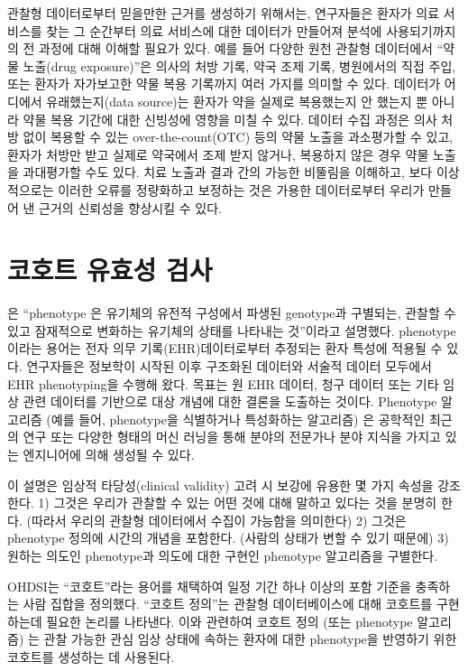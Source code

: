 \documentclass[11pt]{book}
\theoremstyle{definition}
\theoremstyle{definition}
\theoremstyle{definition}
\theoremstyle{remark}
\begin{document}
관찰형 데이터로부터 믿을만한 근거를 생성하기 위해서는, 연구자들은 환자가
의료 서비스를 찾는 그 순간부터 의료 서비스에 대한 데이터가 만들어져
분석에 사용되기까지의 전 과정에 대해 이해할 필요가 있다. 예를 들어
다양한 원천 관찰형 데이터에서 ``약물 노출(drug exposure)''은 의사의 처방
기록, 약국 조제 기록, 병원에서의 직접 주입, 또는 환자가 자가보고한 약물
복용 기록까지 여러 가지를 의미할 수 있다. 데이터가 어디에서
유래했는지(data source)는 환자가 약을 실제로 복용했는지 안 했는지 뿐
아니라 약물 복용 기간에 대한 신빙성에 영향을 미칠 수 있다. 데이터 수집
과정은 의사 처방 없이 복용할 수 있는 over-the-count(OTC) 등의 약물
노출을 과소평가할 수 있고, 환자가 처방만 받고 실제로 약국에서 조제 받지
않거나, 복용하지 않은 경우 약물 노출을 과대평가할 수도 있다. 치료 노출과
결과 간의 가능한 비뚤림을 이해하고, 보다 이상적으로는 이러한 오류를
정량화하고 보정하는 것은 가용한 데이터로부터 우리가 만들어 낸 근거의
신뢰성을 향상시킬 수 있다.

\section{코호트 유효성 검사}\label{CohortValidation}

\citet{hripcsak_2017} 은 ``phenotype 은 유기체의 유전적 구성에서 파생된
genotype과 구별되는, 관찰할 수 있고 잠재적으로 변화하는 유기체의 상태를
나타내는 것''이라고 설명했다. phenotype이라는 용어는 전자 의무
기록(EHR)데이터로부터 추정되는 환자 특성에 적용될 수 있다. 연구자들은
정보학이 시작된 이후 구조화된 데이터와 서술적 데이터 모두에서 EHR
phenotyping을 수행해 왔다. 목표는 원 EHR 데이터, 청구 데이터 또는 기타
임상 관련 데이터를 기반으로 대상 개념에 대한 결론을 도출하는 것이다.
Phenotype 알고리즘 (예를 들어, phenotype을 식별하거나 특성화하는
알고리즘) 은 공학적인 최근의 연구 또는 다양한 형태의 머신 러닝을 통해
분야의 전문가나 분야 지식을 가지고 있는 엔지니어에 의해 생성될 수 있다.

이 설명은 임상적 타당성(clinical validity) 고려 시 보강에 유용한 몇 가지
속성을 강조한다. 1) 그것은 우리가 관찰할 수 있는 어떤 것에 대해 말하고
있다는 것을 분명히 한다. (따라서 우리의 관찰형 데이터에서 수집이
가능함을 의미한다) 2) 그것은 phenotype 정의에 시간의 개념을 포함한다.
(사람의 상태가 변할 수 있기 때문에) 3) 원하는 의도인 phenotype과 의도에
대한 구현인 phenotype 알고리즘을 구별한다.

OHDSI는 ``코호트''라는 용어를 채택하여 일정 기간 하나 이상의 포함 기준을
충족하는 사람 집합을 정의했다. ``코호트 정의''는 관찰형 데이터베이스에
대해 코호트를 구현하는데 필요한 논리를 나타낸다. 이와 관련하여 코호트
정의 (또는 phenotype 알고리즘) 는 관찰 가능한 관심 임상 상태에 속하는
환자에 대한 phenotype을 반영하기 위한 코호트를 생성하는 데 사용된다.
\end{document}
